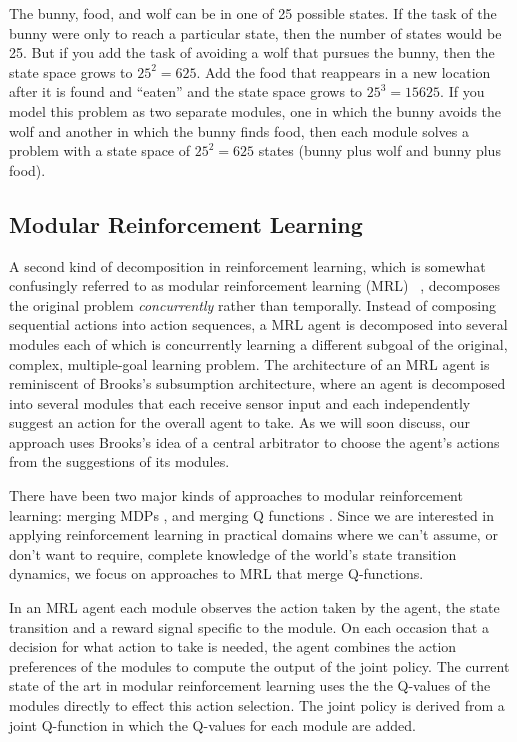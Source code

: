 The bunny, food, and wolf can be in one of 25 possible states. If the task of the bunny were only to reach a particular state, then the number of states would be 25. But if you add the task of avoiding a wolf that pursues the bunny, then the state space grows to $25^2 = 625$. Add the food that reappears in a new location after it is found and ``eaten'' and the state space grows to $25^3 = 15625$. If you model this problem as two separate modules, one in which the bunny avoids the wolf and another in which the bunny finds food, then each module solves a problem with a state space of $25^2 = 625$ states (bunny plus wolf and bunny plus food).

\subsection{Modular Reinforcement Learning}\label{sec:mrl}

A second kind of decomposition in reinforcement learning, which is somewhat confusingly referred to as modular reinforcement learning (MRL) ~\cite{russell2003q-decomposition,sprague2003multiple-goal}, decomposes the original problem {\it concurrently} rather than temporally. Instead of composing sequential actions into action sequences, a MRL agent is decomposed into several modules each of which is concurrently learning a different subgoal of the original, complex, multiple-goal learning problem. The architecture of an MRL agent is reminiscent of Brooks's subsumption architecture, where an agent is decomposed into several modules that each receive sensor input and each independently suggest an action for the overall agent to take. As we will soon discuss, our approach uses Brooks's idea of a central arbitrator to choose the agent's actions from the suggestions of its modules.

There have been two major kinds of approaches to modular reinforcement learning: merging MDPs \cite{singh1998how-to-dynamically}, and merging Q functions \cite{sprague2003multiple-goal,russell2003q-decomposition}. Since we are interested in applying reinforcement learning in practical domains where we can't assume, or don't want to require, complete knowledge of the world's state transition dynamics, we focus on approaches to MRL that merge Q-functions.

In an MRL agent each module observes the action taken by the agent, the state transition and a reward signal specific to the module. On each occasion that a decision for what action to take is needed, the agent combines the action preferences of the modules to compute the output of the joint policy.  The current state of the art in modular reinforcement learning uses the the Q-values of the modules directly to effect this action selection. The joint policy is derived from a joint Q-function in which the Q-values for each module are added.

